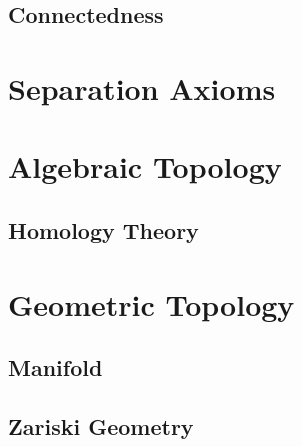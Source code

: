 \subsection{Connectedness}\label{sec:connectedness}



\section{Separation Axioms}\label{sec:separation_axioms}



\section{Algebraic Topology}\label{sec:algebraic_topology}

\subsection{Homology Theory}\label{sec:homology_theory}



\section{Geometric Topology}\label{sec:geometric_topology}

\subsection{Manifold}\label{sec:manifold}

\subsection{Zariski Geometry}\label{sec:zariski_geometry}




